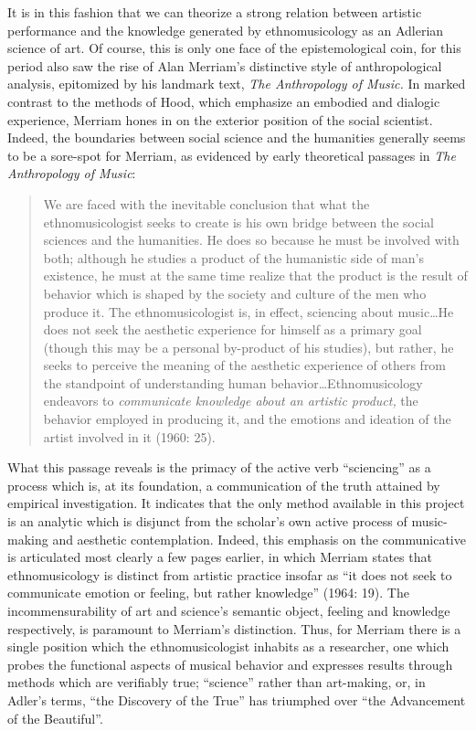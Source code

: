 It is in this fashion that we can theorize a strong relation between
artistic performance and the knowledge generated by ethnomusicology as
an Adlerian science of art. Of course, this is only one face of the
epistemological coin, for this period also saw the rise of Alan
Merriam's distinctive style of anthropological analysis, epitomized by
his landmark text, \emph{The Anthropology of Music.} In marked contrast
to the methods of Hood, which emphasize an embodied and dialogic
experience, Merriam hones in on the exterior position of the social
scientist. Indeed, the boundaries between social science and the
humanities generally seems to be a sore-spot for Merriam, as evidenced
by early theoretical passages in \emph{The Anthropology of Music}:

\begin{quote}
We are faced with the inevitable conclusion that what the
ethnomusicologist seeks to create is his own bridge between the social
sciences and the humanities. He does so because he must be involved with
both; although he studies a product of the humanistic side of man's
existence, he must at the same time realize that the product is the
result of behavior which is shaped by the society and culture of the men
who produce it. The ethnomusicologist is, in effect, sciencing about
music\ldots He does not seek the aesthetic experience for himself as a
primary goal (though this may be a personal by-product of his studies),
but rather, he seeks to perceive the meaning of the aesthetic experience
of others from the standpoint of understanding human
behavior\ldots Ethnomusicology endeavors to \emph{communicate knowledge
about an artistic product,} the behavior employed in producing it, and
the emotions and ideation of the artist involved in it (1960: 25).
\end{quote}

What this passage reveals is the primacy of the active verb
``sciencing'' as a process which is, at its foundation, a communication
of the truth attained by empirical investigation. It indicates that the
only method available in this project is an analytic which is disjunct
from the scholar's own active process of music-making and aesthetic
contemplation. Indeed, this emphasis on the communicative is articulated
most clearly a few pages earlier, in which Merriam states that
ethnomusicology is distinct from artistic practice insofar as ``it does
not seek to communicate emotion or feeling, but rather knowledge''
(1964: 19). The incommensurability of art and science's semantic object,
feeling and knowledge respectively, is paramount to Merriam's
distinction. Thus, for Merriam there is a single position which the
ethnomusicologist inhabits as a researcher, one which probes the
functional aspects of musical behavior and expresses results through
methods which are verifiably true; ``science'' rather than art-making,
or, in Adler's terms, ``the Discovery of the True'' has triumphed over
``the Advancement of the Beautiful''.

